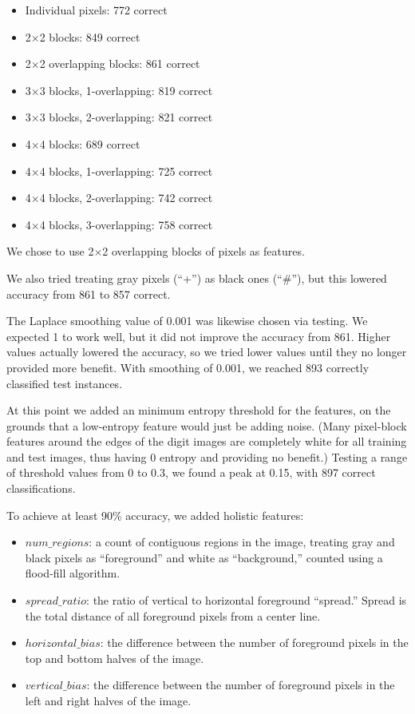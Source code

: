 \documentclass[11pt]{article}
\begin{document}
\begin{itemize}[noitemsep]
\item Individual pixels: 772 correct
\item 2$\times$2 blocks: 849 correct
\item 2$\times$2 overlapping blocks: 861 correct
\item 3$\times$3 blocks, 1-overlapping: 819 correct
\item 3$\times$3 blocks, 2-overlapping: 821 correct
\item 4$\times$4 blocks: 689 correct
\item 4$\times$4 blocks, 1-overlapping: 725 correct
\item 4$\times$4 blocks, 2-overlapping: 742 correct
\item 4$\times$4 blocks, 3-overlapping: 758 correct
\end{itemize}

We chose to use 2$\times$2 overlapping blocks of pixels as features.

We also tried treating gray pixels (``+'') as black ones (``\#''), but this lowered
accuracy from 861 to 857 correct.

The Laplace smoothing value of 0.001 was likewise chosen via testing. We expected 1 to
work well, but it did not improve the accuracy from 861. Higher values actually lowered
the accuracy, so we tried lower values until they no longer provided more benefit. With
smoothing of 0.001, we reached 893 correctly classified test instances.

At this point we added an minimum entropy threshold for the features, on the grounds
that a low-entropy feature would just be adding noise. (Many pixel-block features around
the edges of the digit images are completely white for all training and test images,
thus having 0 entropy and providing no benefit.) Testing a range of threshold values from
0 to 0.3, we found a peak at 0.15, with 897 correct classifications.

To achieve at least 90\% accuracy, we added holistic features:

\begin{itemize}[noitemsep]
\item $num\_regions$: a count of contiguous regions in the image, treating gray and black
pixels as ``foreground'' and white as ``background,'' counted using a flood-fill algorithm.
\item $spread\_ratio$: the ratio of vertical to horizontal foreground ``spread.'' Spread
is the total distance of all foreground pixels from a center line.
\item $horizontal\_bias$: the difference between the number of foreground pixels in the
top and bottom halves of the image.
\item $vertical\_bias$: the difference between the number of foreground pixels in the
left and right halves of the image.
\end{itemize}
\end{document}
